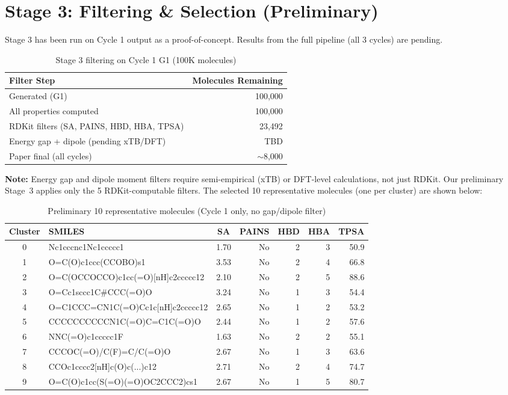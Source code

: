 \documentclass[11pt]{article}
\begin{document}
\section{Stage 3: Filtering \& Selection (Preliminary)}

Stage 3 has been run on Cycle 1 output as a proof-of-concept. Results from the full pipeline (all 3 cycles) are pending.

\begin{table}[H]
\centering
\caption{Stage 3 filtering on Cycle 1 G1 (100K molecules)}
\label{tab:stage3}
\begin{tabular}{@{}lr@{}}
\toprule
\textbf{Filter Step} & \textbf{Molecules Remaining} \\
\midrule
Generated (G1) & 100,000 \\
All properties computed & 100,000 \\
RDKit filters (SA, PAINS, HBD, HBA, TPSA) & 23,492 \\
Energy gap + dipole (pending xTB/DFT) & TBD \\
\midrule
\textcolor{paperblue}{Paper final (all cycles)} & $\sim$8,000 \\
\bottomrule
\end{tabular}
\end{table}

\noindent\textbf{Note:} Energy gap and dipole moment filters require semi-empirical (xTB) or DFT-level calculations, not just RDKit. Our preliminary Stage~3 applies only the 5 RDKit-computable filters. The selected 10 representative molecules (one per cluster) are shown below:

\begin{table}[H]
\centering
\caption{Preliminary 10 representative molecules (Cycle 1 only, no gap/dipole filter)}
\label{tab:rep10}
\scriptsize
\begin{tabular}{@{}clcrrrr@{}}
\toprule
\textbf{Cluster} & \textbf{SMILES} & \textbf{SA} & \textbf{PAINS} & \textbf{HBD} & \textbf{HBA} & \textbf{TPSA} \\
\midrule
0 & Nc1cccnc1Nc1ccccc1 & 1.70 & No & 2 & 3 & 50.9 \\
1 & O=C(O)c1ccc(CCOBO)s1 & 3.53 & No & 2 & 4 & 66.8 \\
2 & O=C(OCCOCCO)c1cc(=O){[}nH{]}c2ccccc12 & 2.10 & No & 2 & 5 & 88.6 \\
3 & O=Cc1sccc1C\#CCC(=O)O & 3.24 & No & 1 & 3 & 54.4 \\
4 & O=C1CCC=CN1C(=O)Cc1c{[}nH{]}c2ccccc12 & 2.65 & No & 1 & 2 & 53.2 \\
5 & CCCCCCCCCCN1C(=O)C=C1C(=O)O & 2.44 & No & 1 & 2 & 57.6 \\
6 & NNC(=O)c1ccccc1F & 1.63 & No & 2 & 2 & 55.1 \\
7 & CCCOC(=O)/C(F)=C/C(=O)O & 2.67 & No & 1 & 3 & 63.6 \\
8 & CCOc1cccc2{[}nH{]}c(O)c(...)c12 & 2.71 & No & 2 & 4 & 74.7 \\
9 & O=C(O)c1cc(S(=O)(=O)OC2CCC2)cs1 & 2.67 & No & 1 & 5 & 80.7 \\
\bottomrule
\end{tabular}
\end{table}
\end{document}

